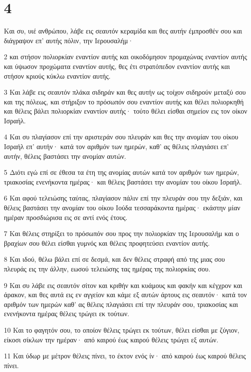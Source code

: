 \chapter{4}

\par Και συ, υιέ ανθρώπου, λάβε εις σεαυτόν κεραμίδα και θες αυτήν έμπροσθέν σου και διάγραψον επ' αυτής πόλιν, την Ιερουσαλήμ·
\par 2 και στήσον πολιορκίαν εναντίον αυτής και οικοδόμησον προμαχώνας εναντίον αυτής και ύψωσον προχώματα εναντίον αυτής, θες έτι στρατόπεδον εναντίον αυτής και στήσον κριούς κύκλω εναντίον αυτής.
\par 3 Και λάβε εις σεαυτόν πλάκα σιδηράν και θες αυτήν ως τοίχον σιδηρούν μεταξύ σου και της πόλεως, και στήριξον το πρόσωπόν σου εναντίον αυτής και θέλει πολιορκηθή και θέλεις βάλει πολιορκίαν εναντίον αυτής· τούτο θέλει είσθαι σημείον εις τον οίκον Ισραήλ.
\par 4 Και συ πλαγίασον επί την αριστεράν σου πλευράν και θες την ανομίαν του οίκου Ισραήλ επ' αυτήν· κατά τον αριθμόν των ημερών, καθ' ας θέλεις πλαγιάσει επ' αυτήν, θέλεις βαστάσει την ανομίαν αυτών.
\par 5 Διότι εγώ επί σε έθεσα τα έτη της ανομίας αυτών κατά τον αριθμόν των ημερών, τριακοσίας ενενήκοντα ημέρας· και θέλεις βαστάσει την ανομίαν του οίκου Ισραήλ.
\par 6 Και αφού τελειώσης ταύτας, πλαγίασον πάλιν επί την πλευράν σου την δεξιάν, και θέλεις βαστάσει την ανομίαν του οίκου Ιούδα τεσσαράκοντα ημέρας· εκάστην μίαν ημέραν προσδιώρισα εις σε αντί ενός έτους.
\par 7 Και θέλεις στηρίξει το πρόσωπόν σου προς την πολιορκίαν της Ιερουσαλήμ και ο βραχίων σου θέλει είσθαι γυμνός και θέλεις προφητεύσει εναντίον αυτής.
\par 8 Και ιδού, θέλω βάλει επί σε δεσμά, και δεν θέλεις στραφή από της μιας σου πλευράς εις την άλλην, εωσού τελειώσης τας ημέρας της πολιορκίας σου.
\par 9 Και συ λάβε εις σεαυτόν σίτον και κριθήν και κυάμους και φακήν και κέγχρον και άρακον, και θες αυτά εις εν αγγείον και κάμε εξ αυτών άρτους εις σεαυτόν· κατά τον αριθμόν των ημερών καθ' ας θέλεις πλαγιάσει επί την πλευράν σου, τριακοσίας και ενενήκοντα ημέρας θέλεις τρώγει εκ τούτων.
\par 10 Και το φαγητόν σου, το οποίον θέλεις τρώγει εκ τούτων, θέλει είσθαι με ζύγιον, είκοσι σίκλων την ημέραν· από καιρού έως καιρού θέλεις τρώγει εξ αυτών.
\par 11 Και ύδωρ με μέτρον θέλεις πίνει, το έκτον ενός ίν· από καιρού έως καιρού θέλεις πίνει.
